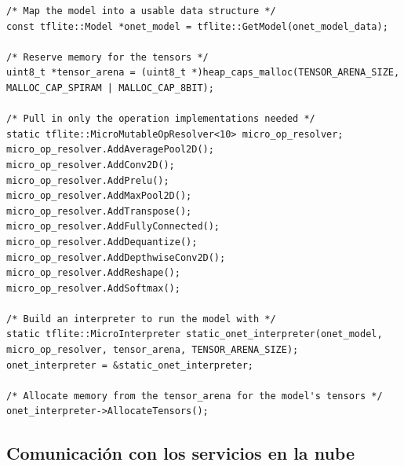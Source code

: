 \begin{lstlisting}[label=cod:vControl,caption=Código para inicializar O-Net con TFLite micro.]
/* Map the model into a usable data structure */
const tflite::Model *onet_model = tflite::GetModel(onet_model_data);

/* Reserve memory for the tensors */
uint8_t *tensor_arena = (uint8_t *)heap_caps_malloc(TENSOR_ARENA_SIZE, MALLOC_CAP_SPIRAM | MALLOC_CAP_8BIT);

/* Pull in only the operation implementations needed */
static tflite::MicroMutableOpResolver<10> micro_op_resolver;
micro_op_resolver.AddAveragePool2D();
micro_op_resolver.AddConv2D();
micro_op_resolver.AddPrelu();
micro_op_resolver.AddMaxPool2D();
micro_op_resolver.AddTranspose();
micro_op_resolver.AddFullyConnected();
micro_op_resolver.AddDequantize();
micro_op_resolver.AddDepthwiseConv2D();
micro_op_resolver.AddReshape();
micro_op_resolver.AddSoftmax();

/* Build an interpreter to run the model with */
static tflite::MicroInterpreter static_onet_interpreter(onet_model, micro_op_resolver, tensor_arena, TENSOR_ARENA_SIZE);
onet_interpreter = &static_onet_interpreter;

/* Allocate memory from the tensor_arena for the model's tensors */
onet_interpreter->AllocateTensors();
\end{lstlisting}



\subsection{Comunicación con los servicios en la nube}

